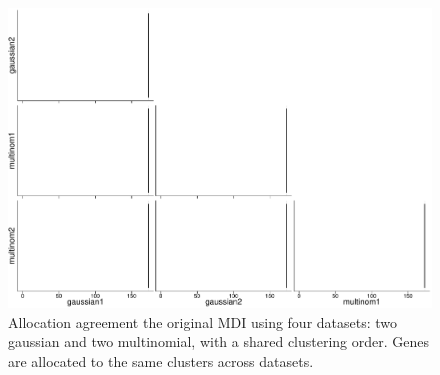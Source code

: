\documentclass[10pt,a4paper]{article}
\begin{document}
\begin{landscape}
\begin{figure}[htbp]
\includegraphics[width = 0.95\linewidth]{plots/mdi_orig_hist.pdf}
\caption{Allocation agreement the original MDI using four datasets: two gaussian and two multinomial, with a shared clustering order. Genes are allocated to the same clusters across datasets.}
\end{figure}
\end{landscape}



\end{document}
